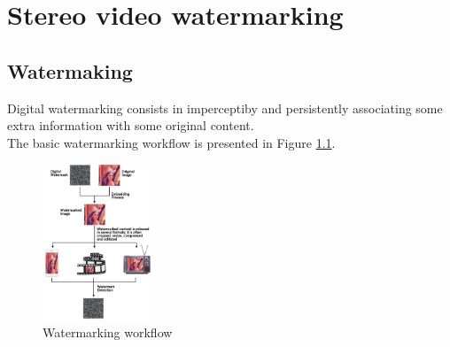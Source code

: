 \chapter{Stereo video watermarking}
\label{wat}

\section{Watermaking}

Digital watermarking consists in imperceptiby and persistently associating some extra information with some original content. \\
The basic watermarking workflow is presented in Figure \ref{fig:workflow}.\\
\begin{figure}[h!]
\centering
\includegraphics[width=0.3\textwidth]{./img/wat_workflow.png}
\caption{\small{Watermarking workflow}}
\label{fig:workflow}
\end{figure}
\newpage
